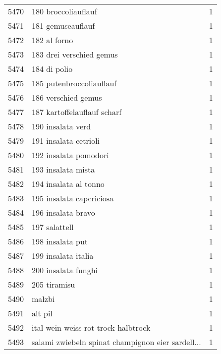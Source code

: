 \begin{tabular}{llr}
5470 &                                180 broccoliauflauf &      1 \\
5471 &                                  181 gemuseauflauf &      1 \\
5472 &                                       182 al forno &      1 \\
5473 &                           183 drei verschied gemus &      1 \\
5474 &                                       184 di polio &      1 \\
5475 &                           185 putenbroccoliauflauf &      1 \\
5476 &                                186 verschied gemus &      1 \\
5477 &                        187 kartoffelauflauf scharf &      1 \\
5478 &                                  190 insalata verd &      1 \\
5479 &                              191 insalata cetrioli &      1 \\
5480 &                              192 insalata pomodori &      1 \\
5481 &                                 193 insalata mista &      1 \\
5482 &                              194 insalata al tonno &      1 \\
5483 &                           195 insalata capcriciosa &      1 \\
5484 &                                 196 insalata bravo &      1 \\
5485 &                                      197 salattell &      1 \\
5486 &                                   198 insalata put &      1 \\
5487 &                                199 insalata italia &      1 \\
5488 &                                200 insalata funghi &      1 \\
5489 &                                       205 tiramisu &      1 \\
5490 &                                             malzbi &      1 \\
5491 &                                            alt pil &      1 \\
5492 &                ital wein weiss rot trock halbtrock &      1 \\
5493 &  salami zwiebeln spinat champignon eier sardell... &      1 \\

\end{tabular}
